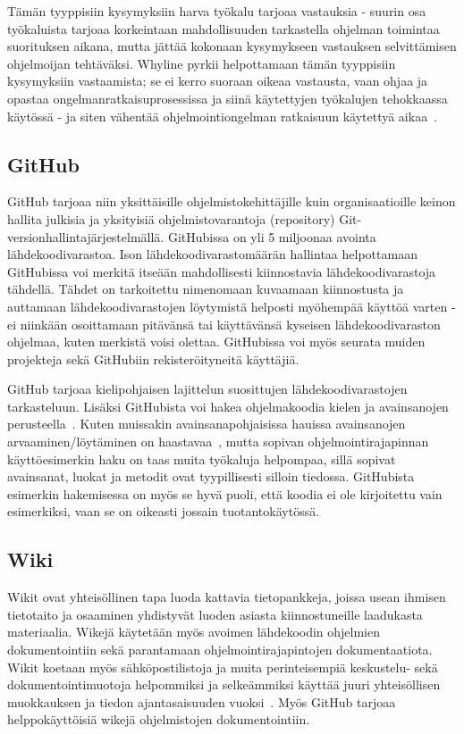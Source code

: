 \documentclass[finnish]{tktltiki2}
\theoremstyle{definition}
\theoremstyle{remark}
\begin{document}
Tämän tyyppisiin kysymyksiin harva työkalu tarjoaa vastauksia - suurin osa työkaluista tarjoaa korkeintaan mahdollisuuden tarkastella ohjelman toimintaa suorituksen aikana, mutta jättää kokonaan kysymykseen vastauksen selvittämisen ohjelmoijan tehtäväksi.
Whyline pyrkii helpottamaan tämän tyyppisiin kysymyksiin vastaamista; se ei kerro suoraan oikeaa vastausta, vaan ohjaa ja opastaa ongelmanratkaisuprosessissa ja siinä käytettyjen työkalujen tehokkaassa käytössä - ja siten vähentää ohjelmointiongelman ratkaisuun käytettyä aikaa~\cite{whyline}.
\subsection{GitHub}
GitHub tarjoaa niin yksittäisille ohjelmistokehittäjille kuin organisaatioille keinon hallita julkisia ja yksityisiä ohjelmistovarantoja (repository) Git-versionhallintajärjestelmällä. GitHubissa on yli 5 miljoonaa avointa lähdekoodivarastoa.
Ison lähdekoodivarastomäärän hallintaa helpottamaan GitHubissa voi merkitä itseään mahdollisesti kiinnostavia lähdekoodivarastoja tähdellä. Tähdet on tarkoitettu nimenomaan kuvaamaan kiinnostusta ja auttamaan lähdekoodivarastojen löytymistä helposti myöhempää käyttöä varten - ei niinkään osoittamaan pitävänsä tai käyttävänsä kyseisen lähdekoodivaraston ohjelmaa\cite{social-networking-meets-se}, kuten merkistä voisi olettaa.
GitHubissa voi myös seurata muiden projekteja sekä GitHubiin rekisteröityneitä käyttäjiä.

GitHub tarjoaa kielipohjaisen lajittelun suosittujen lähdekoodivarastojen tarkasteluun. Lisäksi GitHubista voi hakea ohjelmakoodia kielen ja avainsanojen perusteella~\cite{social-networking-meets-se}. Kuten muissakin avainsanapohjaisissa hauissa avainsanojen arvaaminen/löytäminen on haastavaa~\cite{what-to-search-for}, mutta sopivan ohjelmointirajapinnan käyttöesimerkin haku on taas muita työkaluja helpompaa, sillä sopivat avainsanat, luokat ja metodit ovat tyypillisesti silloin tiedossa. GitHubista esimerkin hakemisessa on myös se hyvä puoli, että koodia ei ole kirjoitettu vain esimerkiksi, vaan se on oikeasti jossain tuotantokäytössä.
\subsection{Wiki}
Wikit ovat yhteisöllinen tapa luoda kattavia tietopankkeja, joissa usean ihmisen tietotaito ja osaaminen yhdistyvät luoden asiasta kiinnostuneille laadukasta materiaalia. Wikejä käytetään myös avoimen lähdekoodin ohjelmien dokumentointiin sekä parantamaan ohjelmointirajapintojen dokumentaatiota. Wikit koetaan myös sähköpostilistoja ja muita perinteisempiä keskustelu- sekä dokumentointimuotoja helpommiksi ja selkeämmiksi käyttää juuri yhteisöllisen muokkauksen ja tiedon ajantasaisuuden vuoksi~\cite{using-wikis-in-sw}.
Myös GitHub tarjoaa helppokäyttöisiä wikejä ohjelmistojen dokumentointiin. \cite{github-wiki}
\end{document}
